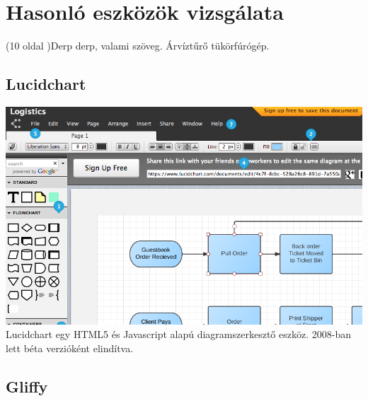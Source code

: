 \chapter{Hasonló eszközök vizsgálata}
(10 oldal )Derp derp, valami szöveg. Árvíztűrő tükörfúrógép.


\section{Lucidchart}

\includegraphics[width=160mm,keepaspectratio]{figures/lucid.png}\\

Lucidchart egy HTML5 és Javascript alapú diagramszerkesztő eszköz.  2008-ban lett béta verzióként elindítva.

 


\section{Gliffy}

